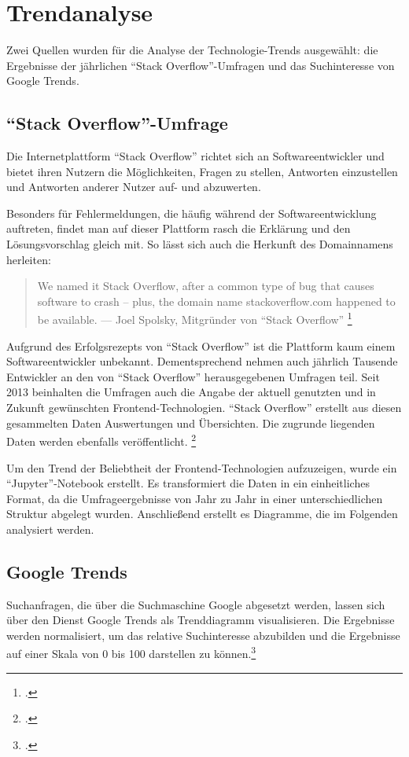\section{Trendanalyse}
\label{sec:Trendanalyse}


Zwei Quellen wurden für die Analyse der Technologie-Trends ausgewählt: die Ergebnisse der jährlichen \enquote{Stack Overflow}-Umfragen und das Suchinteresse von Google Trends.

\subsection{\enquote{Stack Overflow}-Umfrage}
Die Internetplattform \enquote{Stack Overflow} richtet sich an Softwareentwickler und bietet ihren Nutzern die Möglichkeiten, Fragen zu stellen, Antworten einzustellen und Antworten anderer Nutzer auf- und abzuwerten.

Besonders für Fehlermeldungen, die häufig während der Softwareentwicklung auftreten, findet man auf dieser Plattform rasch die Erklärung und den Lösungsvorschlag gleich mit.
So lässt sich auch die Herkunft des Domainnamens herleiten:

\begin{quotation}
We named it Stack Overflow, after a common type of bug that causes software to crash -- plus, the domain name stackoverflow.com happened to be available. --- Joel Spolsky, Mitgründer von \enquote{Stack Overflow} \footcite[][]{TheUnprovenPath}
\end{quotation}

Aufgrund des Erfolgsrezepts von \enquote{Stack Overflow} ist die Plattform kaum einem Soft\-wareentwickler unbekannt.
Dementsprechend nehmen auch jährlich Tausende Entwickler an den von \enquote{Stack Overflow} herausgegebenen Umfragen teil.
Seit  2013 beinhalten die Umfragen auch die Angabe der aktuell genutzten und in Zukunft gewünschten Frontend-Technologien.
\enquote{Stack Overflow} erstellt aus diesen gesammelten Daten Auswertungen und Übersichten. Die zugrunde liegenden Daten werden ebenfalls veröffentlicht.
\footcite[Vgl.][]{StackOverflowInsights} 

Um den Trend der Beliebtheit der Frontend-Technologien aufzuzeigen, wurde ein \enquote{Jupyter}-Notebook erstellt.
Es transformiert die Daten in ein einheitliches Format, da die  Umfrageergebnisse von Jahr zu Jahr in einer unterschiedlichen Struktur abgelegt wurden.
Anschließend erstellt es Diagramme, die im Folgenden analysiert werden.

\subsection{Google Trends} Suchanfragen, die über die Suchmaschine Google abgesetzt werden, lassen sich  über den Dienst Google Trends  als Trenddiagramm visualisieren.
Die Ergebnisse werden normalisiert, um das relative Suchinteresse abzubilden und die Ergebnisse auf einer Skala von 0 bis 100 darstellen zu können.\footcite[Vgl.][]{GoogleTrendsHilfe}

